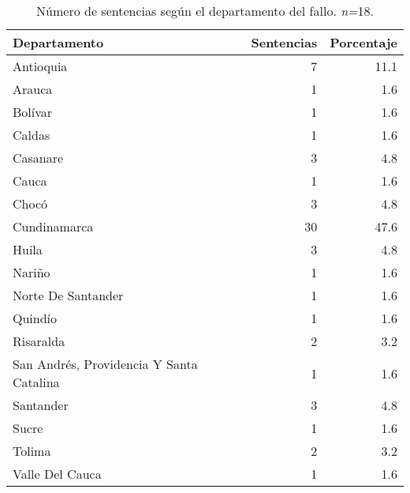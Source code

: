 \begin{table}[H]
\centering
\caption{Número de sentencias según el departamento del fallo. \textit{n=}18.} 
\label{tab:depfal}
\begin{tabular}{lrr}
  \hline
Departamento & Sentencias & Porcentaje \\ 
  \hline
Antioquia &  7 & 11.1 \\ 
  Arauca &  1 & 1.6 \\ 
  Bolívar &  1 & 1.6 \\ 
  Caldas &  1 & 1.6 \\ 
  Casanare &  3 & 4.8 \\ 
  Cauca &  1 & 1.6 \\ 
  Chocó &  3 & 4.8 \\ 
  Cundinamarca & 30 & 47.6 \\ 
  Huila &  3 & 4.8 \\ 
  Nariño &  1 & 1.6 \\ 
  Norte De Santander &  1 & 1.6 \\ 
  Quindío &  1 & 1.6 \\ 
  Risaralda &  2 & 3.2 \\ 
  San Andrés, Providencia Y Santa Catalina &  1 & 1.6 \\ 
  Santander &  3 & 4.8 \\ 
  Sucre &  1 & 1.6 \\ 
  Tolima &  2 & 3.2 \\ 
  Valle Del Cauca &  1 & 1.6 \\ 
   \hline
\end{tabular}
\end{table}
